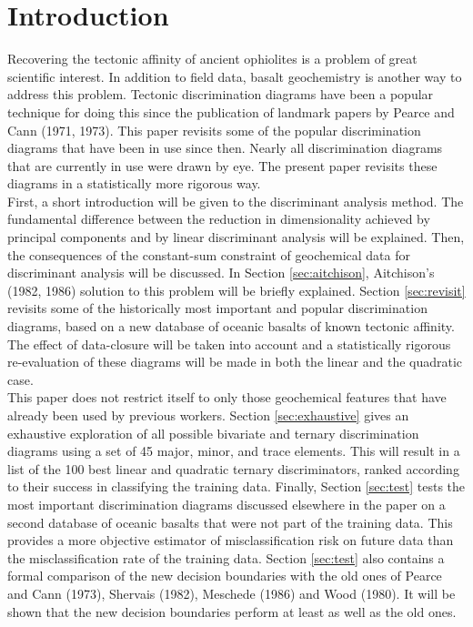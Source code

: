 \documentclass{article}
\begin{document}
\section{Introduction}

Recovering the tectonic affinity of ancient ophiolites is a problem of
great  scientific  interest.   In   addition  to  field  data,  basalt
geochemistry  is  another  way  to  address  this  problem.   Tectonic
discrimination diagrams  have been a popular technique  for doing this
since the  publication of  landmark papers by  Pearce and  Cann (1971,
1973). This paper revisits some of the popular discrimination diagrams
that have been in use  since then.  Nearly all discrimination diagrams
that  are  currently in  use  were drawn  by  eye.  The present  paper
revisits these diagrams in a statistically more rigorous way.\\

First, a short introduction will be given to the discriminant analysis
method.    The  fundamental  difference   between  the   reduction  in
dimensionality  achieved   by  principal  components   and  by  linear
discriminant analysis  will be  explained.  Then, the  consequences of
the  constant-sum  constraint  of  geochemical data  for  discriminant
analysis   will  be   discussed.    In  Section   \ref{sec:aitchison},
Aitchison's  (1982, 1986)  solution to  this problem  will  be briefly
explained.    Section   \ref{sec:revisit}   revisits   some   of   the
historically most important and popular discrimination diagrams, based
on a new database of  oceanic basalts of known tectonic affinity.  The
effect of data-closure will be  taken into account and a statistically
rigorous  re-evaluation of  these diagrams  will be  made in  both the
linear and the quadratic case.\\

This paper does not restrict itself to only those geochemical features
that   have  already   been   used  by   previous  workers.    Section
\ref{sec:exhaustive} gives  an exhaustive exploration  of all possible
bivariate and ternary discrimination diagrams using a set of 45 major,
minor, and trace elements. This will  result in a list of the 100 best
linear and quadratic ternary discriminators, ranked according to their
success   in  classifying   the  training   data.    Finally,  Section
\ref{sec:test}  tests  the   most  important  discrimination  diagrams
discussed  elsewhere in  the paper  on  a second  database of  oceanic
basalts that were not part of  the training data. This provides a more
objective estimator of misclassification  risk on future data than the
misclassification rate  of the training  data.  Section \ref{sec:test}
also contains a formal comparison  of the new decision boundaries with
the  old ones  of Pearce  and Cann  (1973), Shervais  (1982), Meschede
(1986) and  Wood  (1980). It  will  be  shown  that the  new  decision
boundaries perform at least as well as the old ones.
\end{document}

